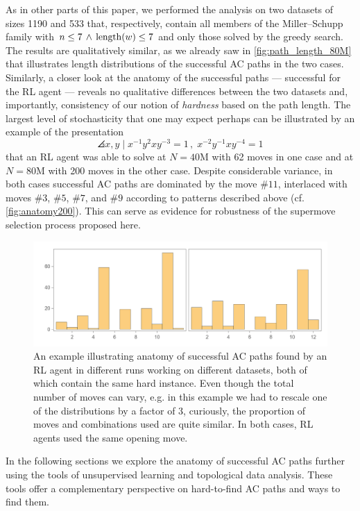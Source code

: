 As in other parts of this paper, we performed the analysis on two datasets of sizes 1190 and 533 that, respectively, contain all members of the Miller–Schupp family with $n \leq 7 \, \land \, \operatorname{length}(w) \leq 7$ and only those solved by the greedy search. The results are qualitatively similar, as we already saw in \autoref{fig:path_length_80M} that illustrates length distributions of the successful AC paths in the two cases. Similarly, a closer look at the anatomy of the successful paths --- successful for the RL agent --- reveals no qualitative differences between the two datasets and, importantly, consistency of our notion of \textit{hardness} based on the path length. The largest level of stochasticity that one may expect perhaps can be illustrated by an example of the presentation
\[
\angles{x, y \mid x^{-1} y^2 x y^{-3} =1 \,, \; x^{-2} y^{-1} x y^{-4} =1 }
\]
that an RL agent was able to solve at $N=40$M with 62 moves in one case and at $N=80$M with 200 moves in the other case. Despite considerable variance, in both cases successful AC paths are dominated by the move $\# 11$, interlaced with moves $\# 3$, $\# 5$, $\# 7$, and $\# 9$ according to patterns described above (cf. \autoref{fig:anatomy200}). This can serve as evidence for robustness of the supermove selection process proposed here.

\begin{figure}[h]
    \centering
	\includegraphics[scale=0.55]{fig/anatomy200.png}
	\caption{An example illustrating anatomy of successful AC paths found by an RL agent in different runs working on different datasets, both of which contain the same hard instance. Even though the total number of moves can vary, e.g. in this example we had to rescale one of the distributions by a factor of 3, curiously, the proportion of moves and combinations used are quite similar. In both cases, RL agents used the same opening move.}
	\label{fig:anatomy200}
\end{figure}

In the following sections we explore the anatomy of successful AC paths further using the tools of unsupervised learning and topological data analysis. These tools offer a complementary perspective on hard-to-find AC paths and ways to find them.

